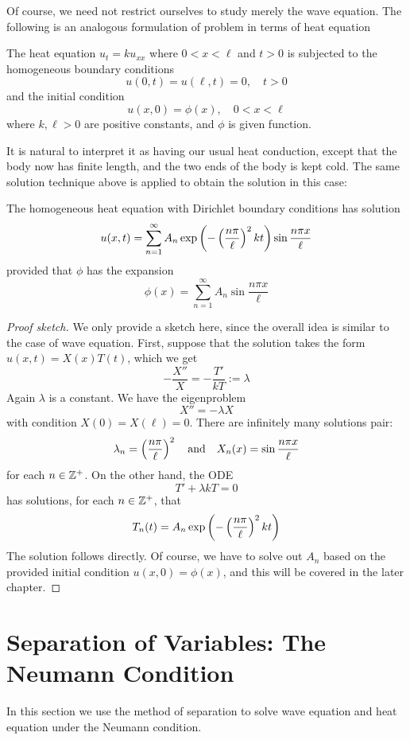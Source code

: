 Of course, we need not restrict ourselves to study merely the wave equation. The following is an analogous formulation of problem in terms of heat equation

\medskip 

\begin{defn} 
    The heat equation $u_{t} = k u_{xx}$ where $0<x<\ell$ and $t>0$ is subjected to the homogeneous boundary conditions
    \[u(0,t) = u(\ell,t)=0, \quad t>0\]
    and the initial condition
    \[u(x,0) = \phi(x), \quad 0<x<\ell\]
    where $k,\ell>0$ are positive constants, and $\phi$ is given function.
\end{defn}

It is natural to interpret it as having our usual heat conduction, except that the body now has finite length, and the two ends of the body is kept cold. The same solution technique above is applied to obtain the solution in this case:

\medskip 

\begin{thm}
    The homogeneous heat equation with Dirichlet boundary conditions has solution
    \[u(x,t) = \sum_{n=1}^{\infty} A_n \exp\left(-\left(\frac{n\pi}{\ell}\right)^2 kt\right)\sin \frac{n\pi x}{\ell}\]
    provided that $\phi$ has the expansion 
    \[\phi(x) = \sum_{n=1}^{\infty} A_n \sin \frac{n\pi x}{\ell}\]
\end{thm}
\begin{proof} [Proof sketch]
    We only provide a sketch here, since the overall idea is similar to the case of wave equation. First, suppose that the solution takes the form $u(x,t) = X(x)T(t)$, which we get 
    \[-\frac{X''}{X} = - \frac{T'}{kT} := \lambda\]
    Again $\lambda$ is a constant. We have the eigenproblem 
    \[X'' = -\lambda X\]
    with condition $X(0) = X(\ell)=0$. There are infinitely many solutions pair:
    \[\lambda_n = \left(\frac{n\pi}{\ell}\right)^2 \quad \text{and} \quad X_n(x) = \sin\frac{n\pi x}{\ell}\]
    for each $n\in {\mathbb Z}^+$. On the other hand, the ODE
    \[T' + \lambda k T = 0\]
    has solutions, for each $n\in {\mathbb Z}^+$, that 
    \[T_n(t) = A_n \exp\left(-\left(\frac{n\pi}{\ell}\right)^2 kt\right)\]
    The solution follows directly. Of course, we have to solve out $A_n$ based on the provided initial condition $u(x,0) = \phi(x)$, and this will be covered in the later chapter.
\end{proof}

\section{Separation of Variables: The Neumann Condition}
In this section we use the method of separation to solve wave equation and heat equation under the Neumann condition.

